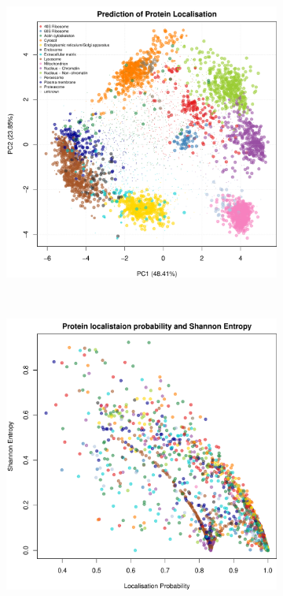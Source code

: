 \documentclass[12pt,english]{article}\usepackage[]{graphicx}\usepackage[]{color}
\makeatletter
\def\maxwidth{ %
  \ifdim\Gin@nat@width>\linewidth
    \linewidth
  \else
    \Gin@nat@width
  \fi
}
\newenvironment{knitrout}{}{} %
\makeatother
\begin{document}
\begin{figure}[h]
\begin{subfigure}[t]{0.5\textwidth}
\begin{knitrout}
{\centering \includegraphics[width=\maxwidth]{figure/pca-tagm-mcmc-1} 

}



\end{knitrout}
    \caption{}
  \end{subfigure}%
\\
  \begin{subfigure}[t]{0.5\textwidth}
    \centering
\begin{knitrout}
\color{fgcolor}

{\centering \includegraphics[width=\maxwidth]{figure/prob-vs-shannon-1} 

}
\end{knitrout}
\end{subfigure}
\end{figure}
\end{document}
